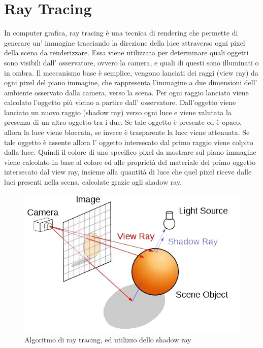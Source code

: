 \section{Ray Tracing}
\label{sec:chapter_stato_arte_ray_tracing}

In computer grafica, ray tracing è una tecnica di rendering che permette di generare un’ immagine tracciando la direzione della luce attraverso ogni pixel della scena da renderizzare.
Essa viene utilizzata per determinare quali oggetti sono visibili dall’ osservatore, ovvero la camera, e quali di questi sono illuminati o in ombra.
Il meccanismo base è semplice, vengono lanciati dei raggi (view ray) da ogni pixel del piano immagine, che rappresenta l’immagine a due dimensioni dell’ ambiente osservato dalla camera, verso la scena. 
Per ogni raggio lanciato viene calcolato l’oggetto più vicino a partire dall’ osservatore. Dall’oggetto viene lanciato un nuovo raggio (shadow ray) verso ogni luce e viene valutata la presenza di un altro oggetto tra i due.
Se tale oggetto è presente ed è opaco, allora la luce viene bloccata, se invece è trasparente la luce viene attenuata.
Se tale oggetto è assente allora l’ oggetto intersecato dal primo raggio viene colpito dalla luce.
Quindi il colore di uno specifico pixel da mostrare sul piano immagine viene calcolato in base al colore ed alle proprietà del materiale del primo oggetto intersecato dal view ray, insieme alla quantità di luce che quel pixel riceve dalle luci presenti nella scena, calcolate grazie agli shadow ray.
\\
\begin{figure}[htb]
 \centering
 \includegraphics[width=0.8\linewidth]{images/chapter_stato_arte/stato_arte_raytracing_shadowray.jpg}\hfill
 \caption[Ray tracing e shadow ray]{Algoritmo di ray tracing, ed utilizzo dello shadow ray}
 \label{fig:stato_arte_raytracing_shadowray}
\end{figure}

